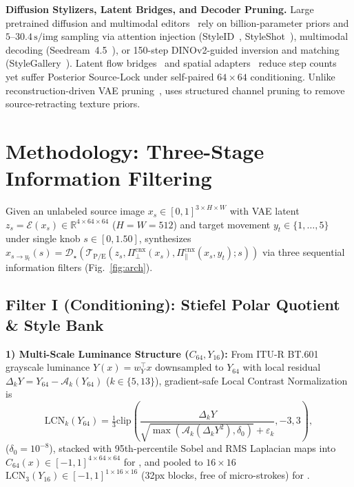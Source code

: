 \documentclass[conference]{IEEEtran}
\newcommand{\R}{\mathbb{R}}
\begin{document}
\textbf{Diffusion Stylizers, Latent Bridges, and Decoder Pruning.}
Large pretrained diffusion and multimodal editors~\cite{meng2021sdedit,zhang2023inst,ye2023ipadapter,hertz2024style,chung2024style,gao2024styleshot,he2026stylegallery,seedream2025} rely on billion-parameter priors and $5\text{--}30.4\,\text{s/img}$ sampling via attention injection (StyleID~\cite{chung2024style}, StyleShot~\cite{gao2024styleshot}), multimodal decoding (Seedream~4.5~\cite{seedream2025}), or 150-step DINOv2-guided inversion and matching (StyleGallery~\cite{he2026stylegallery}). Latent flow bridges~\cite{lipman2022flow,liu2022rectified,chadebec2025lbm,kim2024latentsb} and spatial adapters~\cite{zhang2023controlnet,park2019spade} reduce step counts yet suffer Posterior Source-Lock under self-paired $64\times 64$ conditioning. Unlike reconstruction-driven VAE pruning~\cite{sadat2024litevae,lin2023favae,molchanov2019importance}, \textbf{\methoddec} uses structured channel pruning to remove source-retracting texture priors.

\section{Methodology: Three-Stage Information Filtering}
\label{sec:method}

Given an unlabeled source image $x_s \in [0,1]^{3\times H\times W}$ with VAE latent $z_s = \mathcal{E}(x_s) \in \R^{4\times 64\times 64}$ ($H=W=512$) and target movement $y_t \in \{1,\dots,5\}$ under single knob $s \in [0, 1.50]$, \textbf{\method} synthesizes $\hat{x}_{s\to y_t}(s) = \mathcal{D}_\star(\mathcal{T}_{\mathrm{P/E}}(z_s, \Pi_\perp^{\mathrm{cnx}}(x_s), \Pi_\parallel^{\mathrm{cnx}}(x_s, y_t); s))$ via three sequential information filters (Fig.~\ref{fig:arch}).

\subsection{Filter I (Conditioning): Stiefel Polar Quotient \& Style Bank}
\label{sec:quotient}

\textbf{1) Multi-Scale Luminance Structure ($C_{64}, Y_{16}$):}
From ITU-R BT.601 grayscale luminance $Y(x)=w_Y^\top x$ downsampled to $Y_{64}$ with local residual $\Delta_k Y=Y_{64}-\mathcal{A}_k(Y_{64})$ ($k\in\{5,13\}$), gradient-safe Local Contrast Normalization is
\begin{equation}
\mathrm{LCN}_k(Y_{64}) = \tfrac{1}{3}\mathrm{clip}\!\left(\frac{\Delta_k Y}{\sqrt{\max(\mathcal{A}_k(\Delta_k Y^2),\delta_0)} + \varepsilon_k},-3,3\right),
\label{eq:lcn}
\end{equation}
($\delta_0=10^{-8}$), stacked with 95th-percentile Sobel and RMS Laplacian maps into $C_{64}(x)\in[-1,1]^{4\times 64\times 64}$ for \textbf{\methodecore}, and pooled to $16\times 16$ $\mathrm{LCN}_3(Y_{16})\in[-1,1]^{1\times 16\times 16}$ (32px blocks, free of micro-strokes) for \textbf{\methodpcore}.
\end{document}

